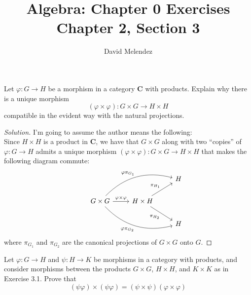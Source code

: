 \documentclass[12pt]{article}
\newenvironment{problem}[2][Problem]{\begin{trivlist}
\item[\hskip \labelsep {\bfseries #1}\hskip \labelsep {\bfseries #2.}]}{\end{trivlist}}
\newcommand{\catname}[1]{\normalfont\textbf{#1}}
\newenvironment{solution}
  {\renewcommand\qedsymbol{$\blacksquare$}\begin{proof}[Solution]}
{\end{proof}}
\begin{document}
\title{Algebra: Chapter 0 Exercises\\ \large Chapter 2, Section 3}
\author{David Melendez}
\maketitle

\begin{problem}{3.1}
  Let $\varphi : G\to H$ be a morphism in a category \catname{C} with products.
  Explain why there is a unique morphism 
  $$(\varphi\times\varphi) : G\times G\to H\times H$$
    compatible in the evident way with the natural projections.
\end{problem}
\begin{solution}
  I'm going to assume the author means the following:\\
  Since $H\times H$ is a product in \catname{C}, we have that 
  $G\times G$ along with two ``copies'' of $\varphi : G\to H$
  admits a unique morphism $(\varphi\times\varphi) : G\times G\to H\times H$
  that makes the following diagram commute:
  \[\begin{tikzcd}
    &&&H\\
    &G\times G 
    \ar{r}{\varphi\times\varphi} 
    \ar[bend left]{urr}{\varphi\pi_{G_1}}
    \ar[bend right]{drr}[swap]{\varphi\pi_{G_2}}
    &H\times H 
    \ar{ur}{\pi_{H_1}}
    \ar{dr}[swap]{\pi_{H_2}}
    &\\
    &&&H
  \end{tikzcd}\]
  where $\pi_{G_1}$ and $\pi_{G_2}$ are the canonical projections of
  $G\times G$ onto $G$.
\end{solution}
\begin{problem}{3.2}
  Let $\varphi : G\to H$ and $\psi : H\to K$ be morphisms in a category with
  products, and consider morphisms between the products 
  $G\times G$, $H\times H$, and $K\times K$ as in Exercise 3.1. 
  Prove that
  $$(\psi\varphi)\times (\psi\varphi) 
  = (\psi\times\psi)(\varphi\times\varphi)$$
\end{problem}
\end{document}
